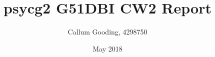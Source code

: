 \documentclass{article}
\begin{document}
	\begin{titlepage}
		\title{psycg2 G51DBI CW2 Report}
		\date{May 2018}
        \author{Callum Gooding, 4298750}
        \maketitle
	\end{titlepage}
\end{document}
